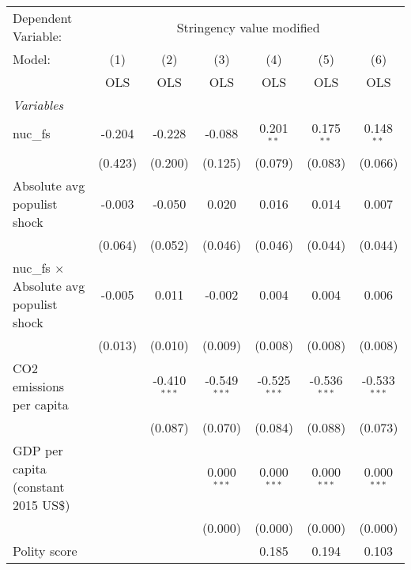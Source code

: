 
\begingroup
\centering
\begin{tabular}{lcccccc}
   \toprule
   Dependent Variable: & \multicolumn{6}{c}{Stringency value modified}\\
   Model:                                         & (1)     & (2)            & (3)            & (4)            & (5)            & (6)\\  
                                                  &  OLS    & OLS            & OLS            & OLS            & OLS            & OLS\\  
   \midrule
   \emph{Variables}\\
   nuc\_fs                                        & -0.204  & -0.228         & -0.088         & 0.201$^{**}$   & 0.175$^{**}$   & 0.148$^{**}$\\   
                                                  & (0.423) & (0.200)        & (0.125)        & (0.079)        & (0.083)        & (0.066)\\   
   Absolute avg populist shock                    & -0.003  & -0.050         & 0.020          & 0.016          & 0.014          & 0.007\\   
                                                  & (0.064) & (0.052)        & (0.046)        & (0.046)        & (0.044)        & (0.044)\\   
   nuc\_fs $\times$ Absolute avg populist shock   & -0.005  & 0.011          & -0.002         & 0.004          & 0.004          & 0.006\\   
                                                  & (0.013) & (0.010)        & (0.009)        & (0.008)        & (0.008)        & (0.008)\\   
   CO2 emissions per capita                       &         & -0.410$^{***}$ & -0.549$^{***}$ & -0.525$^{***}$ & -0.536$^{***}$ & -0.533$^{***}$\\   
                                                  &         & (0.087)        & (0.070)        & (0.084)        & (0.088)        & (0.073)\\   
   GDP per capita (constant 2015 US\$)            &         &                & 0.000$^{***}$  & 0.000$^{***}$  & 0.000$^{***}$  & 0.000$^{***}$\\   
                                                  &         &                & (0.000)        & (0.000)        & (0.000)        & (0.000)\\   
   Polity score                                   &         &                &                & 0.185          & 0.194          & 0.103\\   

\end{tabular}
